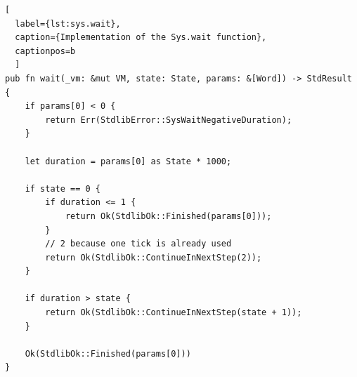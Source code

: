 \begin{lstlisting}[
  label={lst:sys.wait},
  caption={Implementation of the Sys.wait function},
  captionpos=b
  ]
pub fn wait(_vm: &mut VM, state: State, params: &[Word]) -> StdResult {
    if params[0] < 0 {
        return Err(StdlibError::SysWaitNegativeDuration);
    }

    let duration = params[0] as State * 1000;

    if state == 0 {
        if duration <= 1 {
            return Ok(StdlibOk::Finished(params[0]));
        }
        // 2 because one tick is already used
        return Ok(StdlibOk::ContinueInNextStep(2));
    }

    if duration > state {
        return Ok(StdlibOk::ContinueInNextStep(state + 1));
    }

    Ok(StdlibOk::Finished(params[0]))
}
\end{lstlisting}

